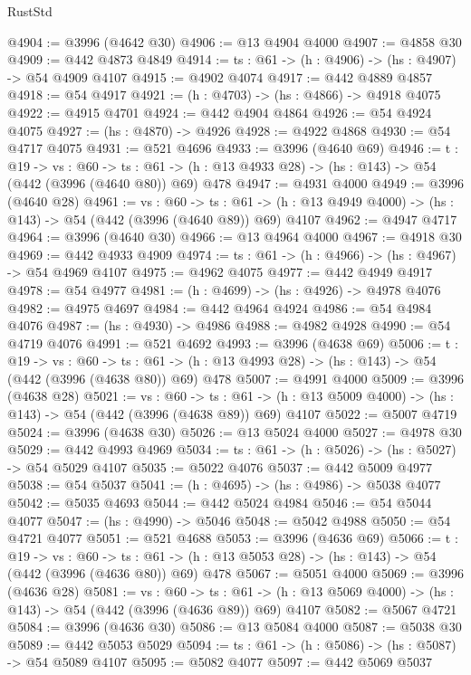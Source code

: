 \begin{lexlean}{RustStd}
\begin{coremodule}
@4904 := @3996 (@4642 @30)
@4906 := @13 @4904 @4000
@4907 := @4858 @30
@4909 := @442 @4873 @4849
@4914 := {ts : @61} -> (h : @4906) -> (hs : @4907) -> @54 @4909 @4107
@4915 := @4902 @4074
@4917 := @442 @4889 @4857
@4918 := @54 @4917
@4921 := (h : @4703) -> (hs : @4866) -> @4918 @4075
@4922 := @4915 @4701
@4924 := @442 @4904 @4864
@4926 := @54 @4924 @4075
@4927 := (hs : @4870) -> @4926
@4928 := @4922 @4868
@4930 := @54 @4717 @4075
@4931 := @521 @4696
@4933 := @3996 (@4640 @69)
@4946 := {t : @19} ->
  {vs : @60} ->
  {ts : @61} -> (h : @13 @4933 @28) -> (hs : @143) -> @54 (@442 (@3996 (@4640 @80)) @69) @478
@4947 := @4931 @4000
@4949 := @3996 (@4640 @28)
@4961 := {vs : @60} ->
  {ts : @61} -> (h : @13 @4949 @4000) -> (hs : @143) -> @54 (@442 (@3996 (@4640 @89)) @69) @4107
@4962 := @4947 @4717
@4964 := @3996 (@4640 @30)
@4966 := @13 @4964 @4000
@4967 := @4918 @30
@4969 := @442 @4933 @4909
@4974 := {ts : @61} -> (h : @4966) -> (hs : @4967) -> @54 @4969 @4107
@4975 := @4962 @4075
@4977 := @442 @4949 @4917
@4978 := @54 @4977
@4981 := (h : @4699) -> (hs : @4926) -> @4978 @4076
@4982 := @4975 @4697
@4984 := @442 @4964 @4924
@4986 := @54 @4984 @4076
@4987 := (hs : @4930) -> @4986
@4988 := @4982 @4928
@4990 := @54 @4719 @4076
@4991 := @521 @4692
@4993 := @3996 (@4638 @69)
@5006 := {t : @19} ->
  {vs : @60} ->
  {ts : @61} -> (h : @13 @4993 @28) -> (hs : @143) -> @54 (@442 (@3996 (@4638 @80)) @69) @478
@5007 := @4991 @4000
@5009 := @3996 (@4638 @28)
@5021 := {vs : @60} ->
  {ts : @61} -> (h : @13 @5009 @4000) -> (hs : @143) -> @54 (@442 (@3996 (@4638 @89)) @69) @4107
@5022 := @5007 @4719
@5024 := @3996 (@4638 @30)
@5026 := @13 @5024 @4000
@5027 := @4978 @30
@5029 := @442 @4993 @4969
@5034 := {ts : @61} -> (h : @5026) -> (hs : @5027) -> @54 @5029 @4107
@5035 := @5022 @4076
@5037 := @442 @5009 @4977
@5038 := @54 @5037
@5041 := (h : @4695) -> (hs : @4986) -> @5038 @4077
@5042 := @5035 @4693
@5044 := @442 @5024 @4984
@5046 := @54 @5044 @4077
@5047 := (hs : @4990) -> @5046
@5048 := @5042 @4988
@5050 := @54 @4721 @4077
@5051 := @521 @4688
@5053 := @3996 (@4636 @69)
@5066 := {t : @19} ->
  {vs : @60} ->
  {ts : @61} -> (h : @13 @5053 @28) -> (hs : @143) -> @54 (@442 (@3996 (@4636 @80)) @69) @478
@5067 := @5051 @4000
@5069 := @3996 (@4636 @28)
@5081 := {vs : @60} ->
  {ts : @61} -> (h : @13 @5069 @4000) -> (hs : @143) -> @54 (@442 (@3996 (@4636 @89)) @69) @4107
@5082 := @5067 @4721
@5084 := @3996 (@4636 @30)
@5086 := @13 @5084 @4000
@5087 := @5038 @30
@5089 := @442 @5053 @5029
@5094 := {ts : @61} -> (h : @5086) -> (hs : @5087) -> @54 @5089 @4107
@5095 := @5082 @4077
@5097 := @442 @5069 @5037

\end{coremodule}
\end{lexlean}
